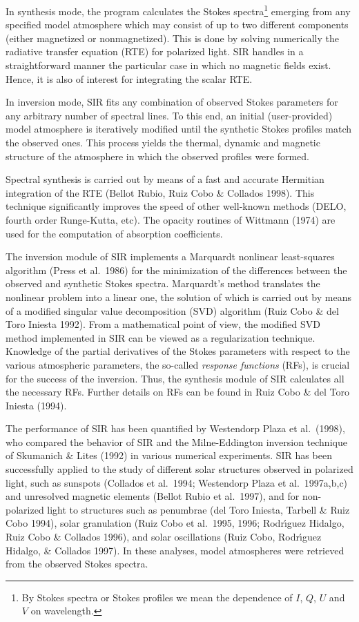\documentclass[11pt]{report}
\begin{document}
In synthesis mode, the program calculates the Stokes
spectra\footnote{By Stokes spectra or Stokes profiles we mean the
dependence of $I$, $Q$, $U$ and $V$ on wavelength.} emerging from any
specified model atmosphere which may consist of up to two different
components (either magnetized or nonmagnetized). This is done by
solving numerically the radiative transfer equation (RTE) for polarized
light. SIR handles in a straightforward manner the particular case in
which no magnetic fields exist. Hence, it is also of interest for
integrating the scalar RTE.

In inversion mode, SIR fits any combination of observed Stokes
parameters for any arbitrary number of spectral lines. To this end, an
initial (user-provided) model atmosphere is iteratively modified until
the synthetic Stokes profiles match the observed ones. This process
yields the thermal, dynamic and magnetic structure of the atmosphere in
which the observed profiles were formed.

Spectral synthesis is carried out by means of a fast and accurate
Hermitian integration of the RTE (Bellot Rubio, Ruiz Cobo \& Collados
1998). This technique significantly improves the speed of other
well-known methods (DELO, fourth order Runge-Kutta, etc).  The 
opacity routines of Wittmann (1974) are used for the computation 
of absorption coefficients.

The inversion module of SIR implements a Marquardt nonlinear
least-squares algorithm (Press et al.\ 1986) for the minimization of
the differences between the observed and synthetic Stokes spectra.
Marquardt's method translates the nonlinear problem into a linear one, 
the solution of which is carried out by means of a modified singular 
value decomposition (SVD) algorithm (Ruiz Cobo \& del Toro
Iniesta 1992). From a mathematical point of view, the modified SVD
method implemented in SIR can be viewed as a regularization technique.
Knowledge of the partial derivatives of the Stokes parameters with
respect to the various atmospheric parameters, the so-called {\em
response functions} (RFs), is crucial for the success of the 
inversion. Thus, the synthesis module of SIR calculates all the
necessary RFs. Further details on RFs can be found in Ruiz 
Cobo \& del Toro Iniesta (1994).

The performance of SIR has been quantified by Westendorp Plaza et
al.\ (1998), who compared the behavior of SIR and the Milne-Eddington
inversion technique of Skumanich \& Lites (1992) in various numerical
experiments. SIR has been successfully applied to the study of
different solar structures observed in polarized light, such as
sunspots (Collados et al.\ 1994; Westendorp Plaza et al.\ 1997a,b,c)
and unresolved magnetic elements (Bellot Rubio et al.\ 1997), and for
non-polarized light to structures such as penumbrae (del Toro Iniesta,
Tarbell \& Ruiz Cobo 1994), solar granulation (Ruiz Cobo et al.\  1995,
1996; Rodr\'{\i}guez Hidalgo, Ruiz Cobo \& Collados 1996), and solar
oscillations (Ruiz Cobo, Rodr\'{\i}guez Hidalgo, \& Collados 1997). In
these analyses, model atmospheres were retrieved from the observed
Stokes spectra.
\end{document}
